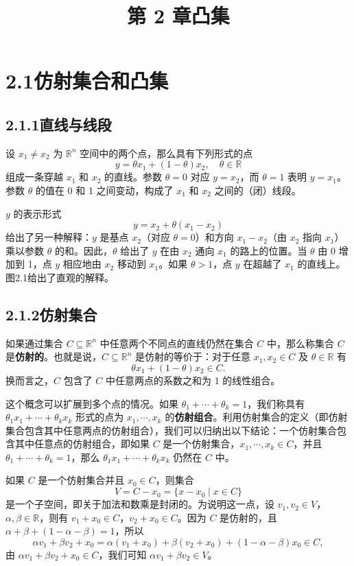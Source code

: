 \documentclass[UTF8, 12pt, fontset=fandol, oneside]{ctexart}
\title{第 2 章\quad 凸集}
\author{}
\date{}
\begin{document}
\maketitle

\section*{2.1\quad 仿射集合和凸集}

\subsection*{2.1.1\quad 直线与线段}

设 $x_1\ne x_2$ 为 $\mathbb{R}^n$ 空间中的两个点，那么具有下列形式的点
\[
  y=\theta x_1+(1-\theta)x_2,\quad \theta\in\mathbb{R}
\]
组成一条穿越 $x_1$ 和 $x_2$ 的直线。参数 $\theta=0$ 对应 $y=x_2$，而 $\theta=1$ 表明 $y=x_1$。参数 $\theta$ 的值在 0 和 1 之间变动，构成了 $x_1$ 和 $x_2$ 之间的（闭）线段。

$y$ 的表示形式
\[
  y=x_2+\theta(x_1-x_2)
\]
给出了另一种解释：$y$ 是基点 $x_2$（对应 $\theta=0$）和方向 $x_1-x_2$（由 $x_2$ 指向 $x_1$）乘以参数 $\theta$ 的和。因此，$\theta$ 给出了 $y$ 在由 $x_2$ 通向 $x_1$ 的路上的位置。当 $\theta$ 由 0 增加到 1，点 $y$ 相应地由 $x_2$ 移动到 $x_1$。如果 $\theta>1$，点 $y$ 在超越了 $x_1$ 的直线上。图2.1给出了直观的解释。

\subsection*{2.1.2\quad 仿射集合}

如果通过集合 $C\subseteq\mathbb{R}^n$ 中任意两个不同点的直线仍然在集合 $C$ 中，那么称集合 $C$ 是\textbf{仿射的}。也就是说，$C\subseteq\mathbb{R}^n$ 是仿射的等价于：对于任意 $x_1,x_2\in C$ 及 $\theta\in\mathbb{R}$ 有
\[
  \theta x_1+(1-\theta)x_2\in C.
\]
换而言之，$C$ 包含了 $C$ 中任意两点的系数之和为 1 的线性组合。

这个概念可以扩展到多个点的情况。如果 $\theta_1+\cdots+\theta_k=1$，我们称具有 $\theta_1x_1+\cdots+\theta_kx_k$ 形式的点为 $x_1,\cdots,x_k$ 的\textbf{仿射组合}。利用仿射集合的定义（即仿射集合包含其中任意两点的仿射组合），我们可以归纳出以下结论：一个仿射集合包含其中任意点的仿射组合，即如果 $C$ 是一个仿射集合，$x_1,\cdots,x_k\in C$，并且 $\theta_1+\cdots+\theta_k=1$，那么 $\theta_1x_1+\cdots+\theta_kx_k$ 仍然在 $C$ 中。

如果 $C$ 是一个仿射集合并且 $x_0\in C$，则集合
\[
  V=C-x_0=\{x-x_0\mid x\in C\}
\]
是一个子空间，即关于加法和数乘是封闭的。为说明这一点，设 $v_1,v_2\in V$，$\alpha,\beta\in\mathbb{R}$，则有 $v_1+x_0\in C$，$v_2+x_0\in C$。因为 $C$ 是仿射的，且 $\alpha+\beta+(1-\alpha-\beta)=1$，所以
\[
  \alpha v_1+\beta v_2+x_0
  =\alpha(v_1+x_0)+\beta(v_2+x_0)+(1-\alpha-\beta)x_0\in C,
\]
由 $\alpha v_1+\beta v_2+x_0\in C$，我们可知 $\alpha v_1+\beta v_2\in V$。
\end{document}
